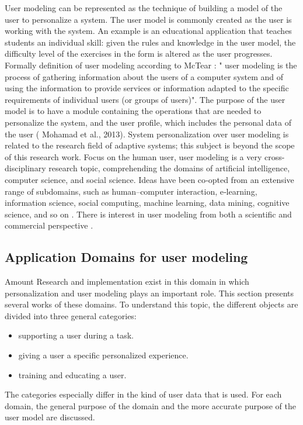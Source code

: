 User modeling can be represented as the technique of building a model of the
user to personalize a system. The user model is commonly created as the user is
working with the system. An example is an educational application that teaches
students an individual skill: given the rules and knowledge in the user model,
the difficulty level of the exercises in the form is altered as the user
progresses.   Formally definition of user modeling according to McTear \cite{mctear1993user} : " user modeling is the process of gathering information about the users of
a computer system and of using the information to provide services or
information adapted to the specific requirements of individual users (or groups
of users)". The purpose of the user model is to have a module containing the
operations that are needed to personalize the system, and the user profile,
which includes the personal data of the user \cite{}( Mohamad et al., 2013).    System
personalization over user modeling is related to the research field of adaptive
systems; this subject is beyond the scope of this research work. Focus on the
human user, user modeling is a very cross-disciplinary research topic,
comprehending the domains of artificial intelligence, computer science, and
social science. Ideas have been co‐opted from an extensive range of subdomains,
such as human–computer interaction, e‐learning, information science, social
computing, machine learning, data mining, cognitive science, and so on \cite{kay2012coming}
\cite{kobsa2001generic}. There is interest in user modeling from both a
scientific and commercial perspective \cite{razmerita2009user}.

\subsection{Application Domains for user modeling}

Amount Research and implementation exist in this domain in which personalization
and user modeling plays an important role. This section presents several works
of these domains. To understand this topic, the different objects are divided
into three general categories:
\begin{itemize}
	\item {supporting a user during a task. }
	\item {giving a user a specific personalized experience. }
	\item {training and educating a user.}
\end{itemize} 
The categories especially differ in the kind of user data that is used. For each
domain, the general purpose of the domain and the more accurate purpose of the
user model are discussed.

